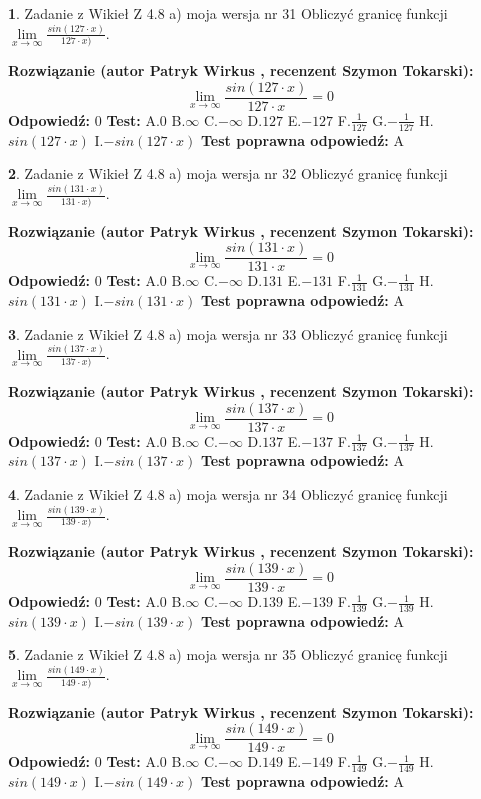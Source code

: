\documentclass[12pt, a4paper]{article}
\theoremstyle{definition} %
\newtheorem{zad}{}
\newcommand{\zadStart}[1]{\begin{zad}#1\newline}
\newcommand{\zadStop}{\end{zad}}
\newcommand{\rozwStart}[2]{\noindent \textbf{Rozwiązanie (autor #1 , recenzent #2): }\newline}
\newcommand{\rozwStop}{\newline}
\newcommand{\odpStart}{\noindent \textbf{Odpowiedź:}\newline}
\newcommand{\odpStop}{\newline}
\newcommand{\testStart}{\noindent \textbf{Test:}\newline}
\newcommand{\testStop}{\newline}
\newcommand{\kluczStart}{\noindent \textbf{Test poprawna odpowiedź:}\newline}
\newcommand{\kluczStop}{\newline}
\begin{document}
\zadStart{Zadanie z Wikieł Z 4.8 a) moja wersja nr 31}
Obliczyć granicę funkcji $\lim\limits_{x\to \infty}\frac{sin(127\cdot x)}{127\cdot x)}$.
\zadStop
\rozwStart{Patryk Wirkus}{Szymon Tokarski}
$$\lim\limits_{x\to \infty}\frac{sin(127\cdot x)}{127\cdot x}=
0$$
\rozwStop
\odpStart
$0$
\odpStop
\testStart
A.$0$ B.$\infty$ C.$-\infty$ D.$127$ E.$-127$
F.$\frac{1}{127}$ G.$-\frac{1}{127}$
H.$sin(127\cdot x)$
I.$-sin(127\cdot x)$
\testStop
\kluczStart
A
\kluczStop



\zadStart{Zadanie z Wikieł Z 4.8 a) moja wersja nr 32}
Obliczyć granicę funkcji $\lim\limits_{x\to \infty}\frac{sin(131\cdot x)}{131\cdot x)}$.
\zadStop
\rozwStart{Patryk Wirkus}{Szymon Tokarski}
$$\lim\limits_{x\to \infty}\frac{sin(131\cdot x)}{131\cdot x}=
0$$
\rozwStop
\odpStart
$0$
\odpStop
\testStart
A.$0$ B.$\infty$ C.$-\infty$ D.$131$ E.$-131$
F.$\frac{1}{131}$ G.$-\frac{1}{131}$
H.$sin(131\cdot x)$
I.$-sin(131\cdot x)$
\testStop
\kluczStart
A
\kluczStop



\zadStart{Zadanie z Wikieł Z 4.8 a) moja wersja nr 33}
Obliczyć granicę funkcji $\lim\limits_{x\to \infty}\frac{sin(137\cdot x)}{137\cdot x)}$.
\zadStop
\rozwStart{Patryk Wirkus}{Szymon Tokarski}
$$\lim\limits_{x\to \infty}\frac{sin(137\cdot x)}{137\cdot x}=
0$$
\rozwStop
\odpStart
$0$
\odpStop
\testStart
A.$0$ B.$\infty$ C.$-\infty$ D.$137$ E.$-137$
F.$\frac{1}{137}$ G.$-\frac{1}{137}$
H.$sin(137\cdot x)$
I.$-sin(137\cdot x)$
\testStop
\kluczStart
A
\kluczStop



\zadStart{Zadanie z Wikieł Z 4.8 a) moja wersja nr 34}
Obliczyć granicę funkcji $\lim\limits_{x\to \infty}\frac{sin(139\cdot x)}{139\cdot x)}$.
\zadStop
\rozwStart{Patryk Wirkus}{Szymon Tokarski}
$$\lim\limits_{x\to \infty}\frac{sin(139\cdot x)}{139\cdot x}=
0$$
\rozwStop
\odpStart
$0$
\odpStop
\testStart
A.$0$ B.$\infty$ C.$-\infty$ D.$139$ E.$-139$
F.$\frac{1}{139}$ G.$-\frac{1}{139}$
H.$sin(139\cdot x)$
I.$-sin(139\cdot x)$
\testStop
\kluczStart
A
\kluczStop



\zadStart{Zadanie z Wikieł Z 4.8 a) moja wersja nr 35}
Obliczyć granicę funkcji $\lim\limits_{x\to \infty}\frac{sin(149\cdot x)}{149\cdot x)}$.
\zadStop
\rozwStart{Patryk Wirkus}{Szymon Tokarski}
$$\lim\limits_{x\to \infty}\frac{sin(149\cdot x)}{149\cdot x}=
0$$
\rozwStop
\odpStart
$0$
\odpStop
\testStart
A.$0$ B.$\infty$ C.$-\infty$ D.$149$ E.$-149$
F.$\frac{1}{149}$ G.$-\frac{1}{149}$
H.$sin(149\cdot x)$
I.$-sin(149\cdot x)$
\testStop
\kluczStart
A
\kluczStop
\end{document}

